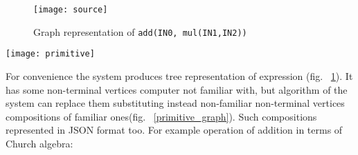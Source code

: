\begin{figure}
\centering
\texttt{[image: source]}
\caption{Graph representation of \texttt{add(IN0, mul(IN1,IN2))}}
\label{source_graph}
\end{figure}

\begin{figure*}
\centering
\texttt{[image: primitive]}
\caption{Graph representation of \texttt{add(IN0, mul(IN1,IN2))} after substitution.}
\label{primitive_graph}
\end{figure*}

For convenience the system produces tree representation of expression  (fig. ~\ref{source_graph}). It has some non-terminal vertices computer not familiar with, but algorithm of the system can replace them substituting instead non-familiar non-terminal vertices compositions of familiar ones(fig. ~\ref{primitive_graph}). Such compositions represented in JSON format too. For example operation of addition in terms of Church algebra:\\

